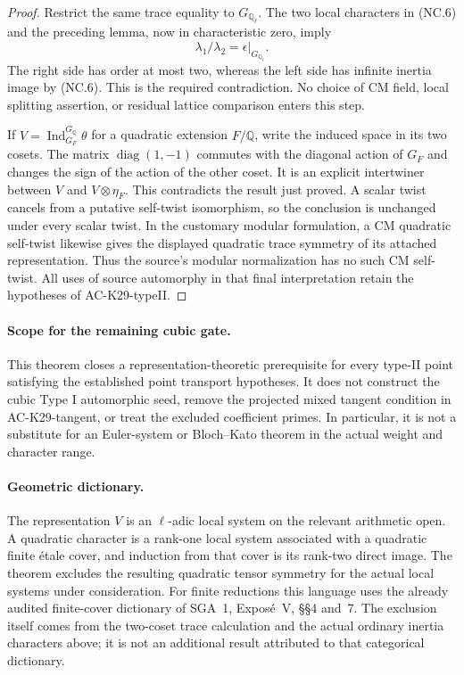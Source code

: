 \begin{proof}
Restrict the same trace equality to $G_{\mathbb Q_\ell}$.
The two local characters in (NC.6) and the preceding lemma,
now in characteristic zero, imply
\[
                   \lambda_1/\lambda_2
                         =\epsilon|_{G_{\mathbb Q_\ell}}.
                                                               \tag{NC.8}
\]
The right side has order at most two, whereas the left
side has infinite inertia image by (NC.6).  This is the
required contradiction.  No choice of CM field, local
splitting assertion, or residual lattice comparison enters
this step.

If $V=\operatorname{Ind}_{G_F}^{G_{\mathbb Q}}\theta$
for a quadratic extension $F/\mathbb Q$, write the induced
space in its two cosets.  The matrix
$\operatorname{diag}(1,-1)$ commutes with the diagonal
action of $G_F$ and changes the sign of the action of the
other coset.  It is an explicit intertwiner between $V$
and $V\otimes\eta_F$.  This contradicts the result just
proved.  A scalar twist cancels from a putative self-twist
isomorphism, so the conclusion is unchanged under every
scalar twist.  In the customary modular formulation, a
CM quadratic self-twist likewise gives the displayed
quadratic trace symmetry of its attached representation.
Thus the source's modular normalization has no such CM
self-twist.  All uses of source automorphy in that final
interpretation retain the hypotheses of AC-K29-typeII.
\end{proof}

\paragraph{Scope for the remaining cubic gate.}
This theorem closes a representation-theoretic prerequisite
for every type-II point satisfying the established point
transport hypotheses.  It does not construct the cubic
Type I automorphic seed, remove the projected mixed tangent
condition in AC-K29-tangent, or treat the excluded coefficient
primes.  In particular, it is not a substitute for an
Euler-system or Bloch--Kato theorem in the actual weight and
character range.

\paragraph{Geometric dictionary.}
The representation $V$ is an $\ell$-adic local system on
the relevant arithmetic open.  A quadratic character is
a rank-one local system associated with a quadratic finite
\'etale cover, and induction from that cover is its
rank-two direct image.  The theorem excludes the resulting
quadratic tensor symmetry for the actual local systems
under consideration.  For finite reductions this language
uses the already audited finite-cover dictionary of
SGA~1, Expos\'e~V, \S\S4 and~7.  The exclusion itself
comes from the two-coset trace calculation and the actual
ordinary inertia characters above; it is not an additional
result attributed to that categorical dictionary.
